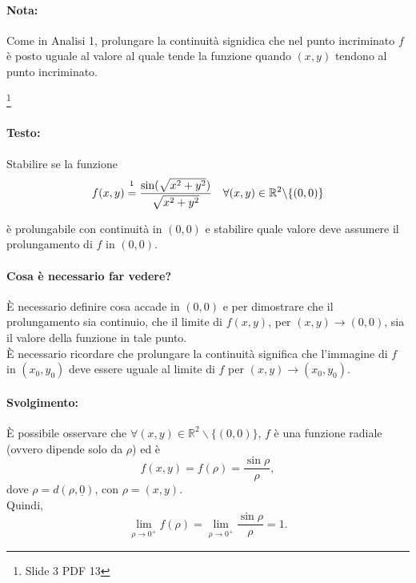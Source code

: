 \paragraph{Nota:} Come in Analisi 1, prolungare la continuità signidica che nel punto incriminato $f$ è posto uguale al valore al quale tende la funzione quando $(x, y)$ tendono al punto incriminato.

\begin{example}\footnote{Slide 3 PDF 13}
	\paragraph{Testo:} Stabilire se la funzione
	\begin{equation*}
		f(x,y) \overset{\footnotemark}{=} \frac{\sin(\sqrt{x^2+y^2})}{\sqrt{x^2+y^2}}\quad \forall(x,y)\in\mathbb{R}^2\backslash\{(0,0)\}
	\end{equation*}
	
	\noindent è prolungabile con continuità in $(0,0)$ e stabilire quale valore deve assumere il prolungamento di $f$ in $(0,0)$.
	\paragraph{Cosa è necessario far vedere?} È necessario definire cosa accade in $(0,0)$ e per dimostrare che il prolungamento sia continuio, che il limite di $f(x,y)$, per $(x,y)\rightarrow(0,0)$, sia il valore della funzione in tale punto.\\
	È necessario ricordare che prolungare la continuità significa che l'immagine di $f$ in $(x_0,y_0)$ deve essere uguale al limite di $f$ per $(x,y)\rightarrow(x_0,y_0)$.
	\paragraph{Svolgimento:} È possibile osservare che $\forall (x,y)\in\mathbb R^2\backslash\{(0,0)\}$, $f$ è una funzione radiale (ovvero dipende solo da $\rho$) ed è
	\begin{equation*}
		f(x,y)=f(\rho)=\frac{\sin\rho}{\rho},
	\end{equation*}
	dove $\rho = d(\rho , \underline{0})$, con $\rho=(x,y)$.\\
	Quindi,
	\begin{equation*}
		\lim_{\rho\rightarrow0^+} f(\rho)=\lim_{\rho\rightarrow 0^+} \frac{\sin\rho}{\rho}=1.
	\end{equation*}

\end{example}
